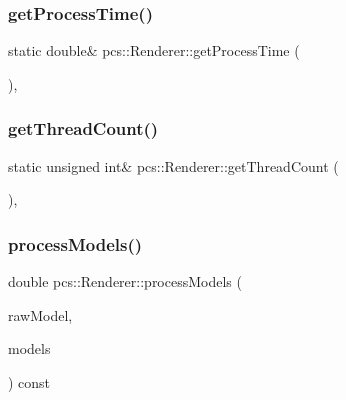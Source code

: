 \subsubsection{\texorpdfstring{get\+Process\+Time()}{getProcessTime()}}
{\footnotesize\ttfamily static double\& pcs\+::\+Renderer\+::get\+Process\+Time (\begin{DoxyParamCaption}{ }\end{DoxyParamCaption})\hspace{0.3cm}{\ttfamily [inline]}, {\ttfamily [static]}}

\mbox{\label{classpcs_1_1Renderer_a928518fe0b60785048b1a7780df14303}} 
\subsubsection{\texorpdfstring{get\+Thread\+Count()}{getThreadCount()}}
{\footnotesize\ttfamily static unsigned int\& pcs\+::\+Renderer\+::get\+Thread\+Count (\begin{DoxyParamCaption}{ }\end{DoxyParamCaption})\hspace{0.3cm}{\ttfamily [inline]}, {\ttfamily [static]}}

\mbox{\label{classpcs_1_1Renderer_adae0f95f56f7261ec52ea32eaa3ad27b}} 
\subsubsection{\texorpdfstring{process\+Models()}{processModels()}}
{\footnotesize\ttfamily double pcs\+::\+Renderer\+::process\+Models (\begin{DoxyParamCaption}\item[{\hyperlink{classpcs_1_1RawModel}{Raw\+Model} $\ast$}]{raw\+Model,  }\item[{std\+::vector$<$ \hyperlink{classpcs_1_1Model}{Model} $\ast$$>$ \&}]{models }\end{DoxyParamCaption}) const\hspace{0.3cm}{\ttfamily [protected]}}

\mbox{\label{classpcs_1_1Renderer_aba6bdcf38357cdfea898e0f7b3cb1757}} 
